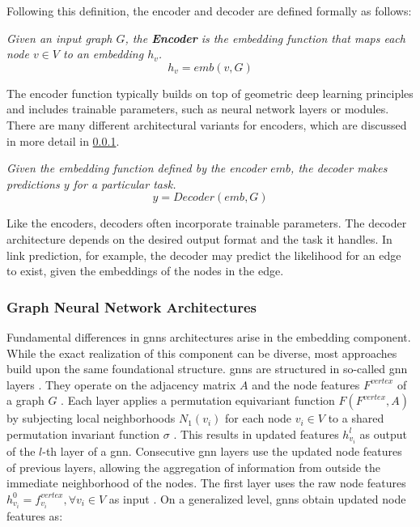 Following this definition, the encoder and decoder are defined formally as follows:

\begin{definition}
    \label{d_Encoder}
    \textit{Given an input graph $G$, the \textbf{Encoder} is the embedding function that maps each node $v \in V$ to an embedding $h_v$.}
    \begin{equation}
        h_v = emb(v, G)
    \end{equation}
\end{definition}

The encoder function typically builds on top of geometric deep learning principles and includes trainable parameters, such as neural network layers or modules. There are many different architectural variants for encoders, which are discussed in more detail in \ref{s_Background_GNNs_GNNArchtectures}. 

\begin{definition}
    \label{d_Decoder}
    \textit{Given the embedding function defined by the encoder $emb$, the decoder makes predictions $y$ for a particular task.}
    \begin{equation}
        y = Decoder(emb, G)
    \end{equation}
\end{definition}

Like the encoders, decoders often incorporate trainable parameters. The decoder architecture depends on the desired output format and the task it handles. In link prediction, for example, the decoder may predict the likelihood for an edge to exist, given the embeddings of the nodes in the edge.

\subsubsection{Graph Neural Network Architectures}
\label{s_Background_GNNs_GNNArchtectures}

Fundamental differences in \glspl{gnn} architectures arise in the embedding component. While the exact realization of this component can be diverse, most approaches build upon the same foundational structure. \glspl{gnn} are structured in so-called \gls{gnn} layers \cite{bronstein_geometric_2021, wu_comprehensive_2021, zhou_graph_2020}. They operate on the adjacency matrix $A$ and the node features $F^{vertex}$ of a graph $G$ \cite{bronstein_geometric_2021}. Each layer applies a permutation equivariant function $F(F^{vertex}, A)$ by subjecting local neighborhoods $N_1(v_i)$ for each node $v_i \in V$ to a shared permutation invariant function $\sigma$ \cite{bronstein_geometric_2021}. This results in updated features $h_{v_i}^l$ as output of the $l$-th layer of a \gls{gnn}. Consecutive \gls{gnn} layers use the updated node features of previous layers, allowing the aggregation of information from outside the immediate neighborhood of the nodes. The first layer uses the raw node features $h_{v_i}^0 = f^{vertex}_{v_i}, \forall v_i \in V$ as input \cite{hamilton_representation_2017}. On a generalized level, \glspl{gnn} obtain updated node features as:

